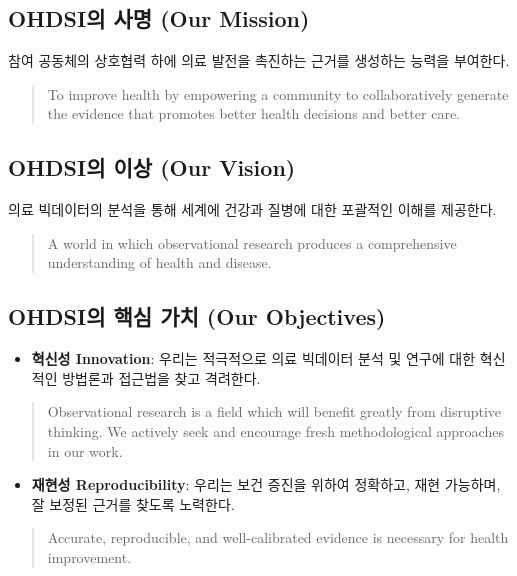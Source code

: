 \documentclass[11pt]{book}
\providecommand{\tightlist}{%
  \setlength{\itemsep}{0pt}\setlength{\parskip}{0pt}}
\theoremstyle{definition}
\theoremstyle{definition}
\theoremstyle{definition}
\theoremstyle{remark}
\begin{document}
\subsection{OHDSI의 사명 (Our Mission)}\label{ohdsi--our-mission}

참여 공동체의 상호협력 하에 의료 발전을 촉진하는 근거를 생성하는 능력을
부여한다.

\begin{quote}
To improve health by empowering a community to collaboratively generate
the evidence that promotes better health decisions and better care.
\end{quote}

\subsection{OHDSI의 이상 (Our Vision)}\label{ohdsi--our-vision}

의료 빅데이터의 분석을 통해 세계에 건강과 질병에 대한 포괄적인 이해를
제공한다.

\begin{quote}
A world in which observational research produces a comprehensive
understanding of health and disease. 
\end{quote}

\subsection{OHDSI의 핵심 가치 (Our
Objectives)}\label{ohdsi---our-objectives}

\begin{itemize}
\tightlist
\item
  \textbf{혁신성 Innovation}: 우리는 적극적으로 의료 빅데이터 분석 및
  연구에 대한 혁신적인 방법론과 접근법을 찾고 격려한다.
\end{itemize}

\begin{quote}
Observational research is a field which will benefit greatly from
disruptive thinking. We actively seek and encourage fresh methodological
approaches in our work.
\end{quote}

\begin{itemize}
\tightlist
\item
  \textbf{재현성 Reproducibility}: 우리는 보건 증진을 위하여 정확하고,
  재현 가능하며, 잘 보정된 근거를 찾도록 노력한다.
\end{itemize}

\begin{quote}
Accurate, reproducible, and well-calibrated evidence is necessary for
health improvement.
\end{quote}
\end{document}

